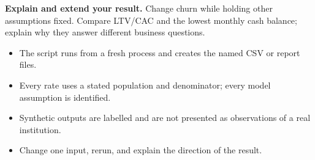 \begin{verification}
\textbf{Explain and extend your result.} Change churn while holding other assumptions fixed. Compare LTV/CAC and the lowest monthly cash balance; explain why they answer different business questions.

\begin{itemize}\item The script runs from a fresh process and creates the named CSV or report files.\item Every rate uses a stated population and denominator; every model assumption is identified.\item Synthetic outputs are labelled and are not presented as observations of a real institution.\item Change one input, rerun, and explain the direction of the result.\end{itemize}\end{verification}
